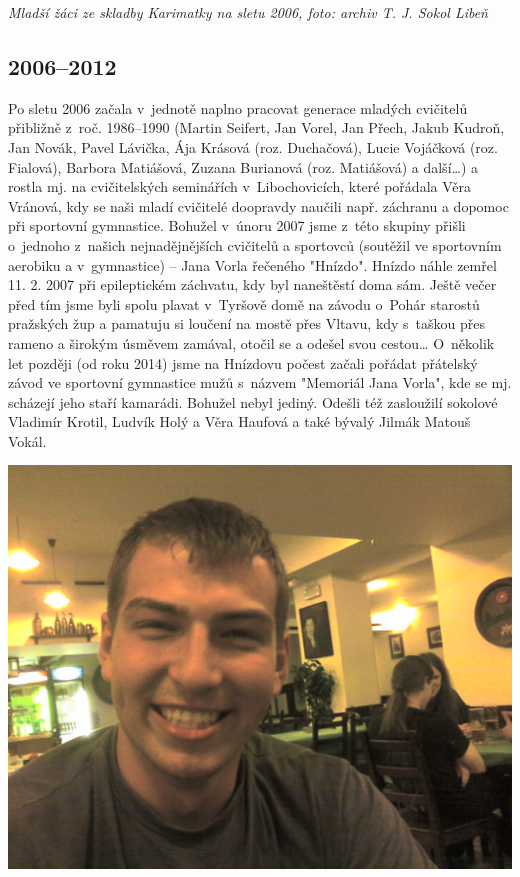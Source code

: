 \documentclass[a5paper, 11pt, twoside]{article}
\begin{document}
\textit{Mladší žáci ze skladby Karimatky na sletu 2006, foto: archiv T. J.
Sokol Libeň}

\subsection{2006--2012}

Po sletu 2006 začala v~jednotě naplno pracovat generace mladých
cvičitelů přibližně z~roč. 1986--1990 (Martin Seifert, Jan Vorel, Jan
Přech, Jakub Kudroň, Jan Novák, Pavel Lávička, Ája Krásová (roz.
Duchačová), Lucie Vojáčková (roz. Fialová), Barbora Matiášová, Zuzana Burianová (roz. Matiášová) a
další\ldots) a rostla mj. na cvičitelských seminářích v~Libochovicích,
které pořádala Věra Vránová, kdy se naši mladí cvičitelé doopravdy
naučili např. záchranu a dopomoc při sportovní gymnastice. Bohužel
v~únoru 2007 jsme z~této skupiny přišli o~jednoho z~našich nejnadějnějších
cvičitelů a sportovců (soutěžil ve sportovním aerobiku a v~gymnastice)
-- Jana Vorla řečeného "Hnízdo". Hnízdo náhle zemřel 11. 2. 2007 při
epileptickém záchvatu, kdy byl naneštěstí doma sám. Ještě večer před tím
jsme byli spolu plavat v~Tyršově domě na závodu o~Pohár starostů
pražských žup a pamatuju si loučení na mostě přes Vltavu, kdy s~taškou
přes rameno a širokým úsměvem zamával, otočil se a odešel svou
cestou\ldots{} O~několik let později (od roku 2014) jsme na Hnízdovu
počest začali pořádat přátelský závod ve sportovní gymnastice mužů
s~názvem "Memoriál Jana Vorla", kde se mj. scházejí jeho staří kamarádi.
Bohužel nebyl jediný. Odešli též zasloužilí sokolové Vladimír Krotil,
Ludvík Holý a Věra Haufová a také bývalý Jilmák Matouš Vokál.

 \includegraphics[width=\textwidth]{img/57_hnizdo.jpg}
\end{document}
